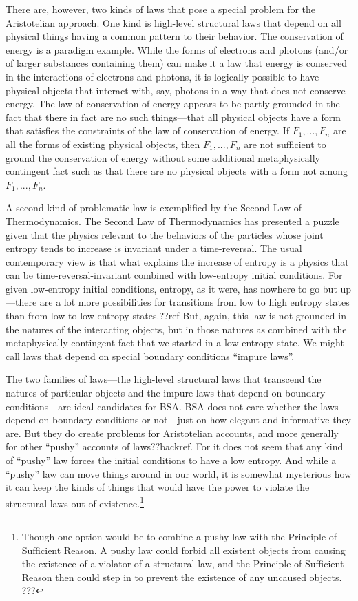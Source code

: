 There are, however, two kinds of laws that pose a special problem for the Aristotelian approach. One kind is high-level
structural laws that depend on all physical things having a common pattern to their behavior. The conservation of energy
is a paradigm example. While the forms of electrons and photons (and/or of larger substances containing them) can make 
it a law that energy is conserved in the interactions of electrons and photons, it is logically possible to have 
physical objects that interact with, say, photons in a way that does not conserve energy. The law of conservation of 
energy appears to be partly grounded in the fact that there in fact are no such things---that all physical objects have a 
form that satisfies the constraints of the law of conservation of energy. If $F_1,...,F_n$ are all the forms
of existing physical objects, then $F_1,...,F_n$ are not sufficient to ground the conservation of energy without some
additional metaphysically contingent fact such as that there are no physical objects with a form not among $F_1,...,F_n$. 

A second kind of problematic law is exemplified by the Second Law of Thermodynamics. The Second Law of Thermodynamics
has presented a puzzle given that the physics relevant to the behaviors of the particles whose joint entropy tends to increase
is invariant under a time-reversal. The usual contemporary view is that what explains the increase of entropy is a physics
that can be time-reversal-invariant combined with low-entropy initial conditions. For given low-entropy initial conditions,
entropy, as it were, has nowhere to go but up---there are a lot more possibilities for transitions from low to high entropy states
than from low to low entropy states.??ref But, again, this law is not grounded in the natures of the interacting objects, 
but in those natures as combined with the metaphysically contingent fact that we started in a low-entropy state.  We might 
call laws that depend on special boundary conditions ``impure laws''. 

The two families of laws---the high-level structural laws that transcend the natures of particular objects and the impure
laws that depend on boundary conditions---are ideal candidates for BSA. BSA does not care whether the laws depend on boundary
conditions or not---just on how elegant and informative they are. But they do create problems for Aristotelian accounts, 
and more generally for other ``pushy'' accounts of laws??backref. For it does not seem that any kind of ``pushy'' law 
forces the initial conditions to have a low entropy. And while a ``pushy'' law can move things around in our world, it is
somewhat mysterious how it can keep the kinds of things that would have the power to violate the structural laws out of 
existence.\footnote{Though one option would be to combine a pushy law with the Principle of Sufficient Reason. A pushy
law could forbid all existent objects from causing the existence of a violator of a structural law, and the Principle of Sufficient Reason
then could step in to prevent the existence of any uncaused objects. ???}


\chaptertail


